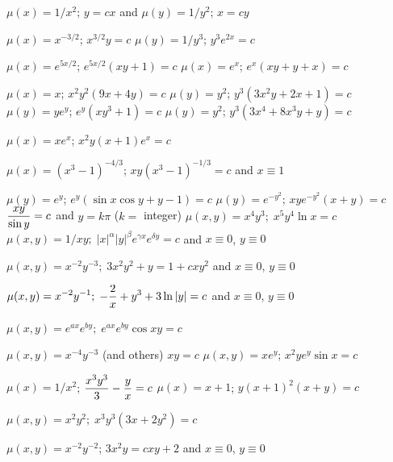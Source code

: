 \medskip

 $\mu(x)=1/x^{2}$;\; $y=cx$ and $\mu(y)=1/y^{2}$;    $x=cy$

 $\mu(x)=x^{-3/2}$;\; $x^{3/2}y=c$
 $\mu(y)={1/y^{3}}$;\; $y^{3}e^{2x}=c$

$\mu(x)=e^{5x/2}$;\; $e^{5x/2}(xy+1)=c$
  $\mu(x)=e^{x}$;\; $e^{x}(xy+y+x)=c$

 $\mu(x)=x$;\;  $x^{2}y^{2}(9x+4y)=c$
 $\mu(y)=y^{2}$;\; $y^{3}(3x^{2}y+2x+1)=c$
 $\mu(y)=ye^{y}$;\; $e^{y}(xy^{3}+1)=c$
 $\mu(y)=y^{2}$;   $y^{3}(3x^{4}+8x^{3}y+y)=c$

 $\mu(x)=xe^{x}$;\; $x^{2}y(x+1)e^{x}=c$

 $\mu(x)=(x^{3}-1)^{-4/3}$;\; $xy(x^{3}-1)^{-1/3}=c$ and
$x\equiv1$

$\mu(y)=e^{y}$;\; $e^{y}(\sin x\cos y+y-1)=c$
 $\mu(y)=e^{-y^{2}}$;   $xye^{-y^{2}}(x+y)=c$
 $\displaystyle\frac{xy}{\sin y}=c$  and $y=k\pi$ ($k=$ integer)
  $\mu(x,y)=x^{4}y^{3};\;x^{5}y^{4}\ln x=c$
  $\mu(x,y)=1/xy;\;|x|^{\alpha}|y|^{\beta}e^{\gamma
x}e^{\delta y}=c$
 and $x\equiv0$, $y\equiv0$

  $\mu(x,y)=x^{-2}y^{-3};\;3x^{2}y^{2}+y=1+cxy^{2}$ and
$x\equiv0$, $y\equiv0$

 $\displaystyle{\mu(x,y)=x^{-2}y^{-1};\;-\frac{2}{x}+y^{3}+3\ln
|y|=c}$ and $x\equiv0$, $y\equiv0$

 $\mu(x,y)=e^{ax}e^{by};\;e^{ax}e^{by}\cos xy=c$

  $\mu(x,y)=x^{-4}y^{-3}$ (and others)\; $xy=c$
 $\mu(x,y)=xe^{y}$;    $x^{2}ye^{y}\sin x=c$

 $\mu(x)=1/x^{2}$;\; $\displaystyle\frac{x^{3}y^{3}}{3}-\displaystyle\frac{y}{x}=c$
 $\mu(x)=x+1$;\; $y(x+1)^{2}(x+y)=c$

  $\mu(x,y)=x^{2}y^{2};\;x^{3}y^{3}(3x+2y^{2})=c$

  $\mu(x,y)=x^{-2}y^{-2}$;   $3x^{2}y=cxy+2$ and $x\equiv0$,
$y\equiv0$
\bigskip

